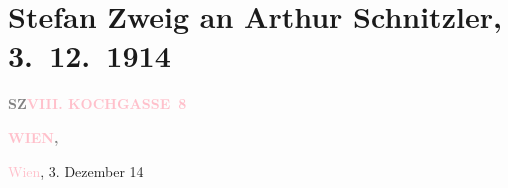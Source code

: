 

\renewcommand{\erwaehntePersonen}{Personen: Anatole France, Detlev von Liliencron, Maurice Maeterlinck, Romain Rolland, Olga Schnitzler, Franz Peter Schubert, Robert Schumann, William Shakespeare, Leo N. von Tolstoi, Jakob von Winternitz, Stefan Zweig}
\renewcommand{\erwaehnteOrte}{Orte: Frankreich, Kochgasse 29, Kochgasse 8, Romandy, Russland, Schweiz, Volkshochschule Ottakring, Wien, Währinger Cottage}
\renewcommand{\erwaehnteWerke}{Werke: Die Schaubühne, Journal de Genève, Liliencron, Tagebuch, Une protestation d’Arthur Schnitzler, Winterreise [op. 89 D 911], Winterreise. Der Wegweiser}
\section[Stefan Zweig an Arthur Schnitzler, 3. 12. 1914]{Stefan Zweig an Arthur Schnitzler, 3. 12. 1914}
\nopagebreak{}
\rehead{ }\normalsize\beginnumbering{}
\toendnotes[C]{\smallbreak\pagebreak[2]}
\toendnotes[C]{\smallbreak}
\pstart
           {\pb}\textcolor{gray}{\textbf{SZ}}\hfill \textcolor{gray}{\textbf{\textcolor{pink}{VIII. KOCHGASSE 8}{}\ledrightnote{\textcolor{pink}{Kochgasse 8}}}}\pend
           
\pstart
           \raggedleft{}\textcolor{gray}{\textbf{\textcolor{pink}{WIEN}{}\ledrightnote{\textcolor{pink}{Wien}},}}\pend
           
\pstart
           \raggedleft{}\textcolor{pink}{Wien}{}\ledrightnote{\textcolor{pink}{Wien}}, 3. Dezember 14\pend
           
